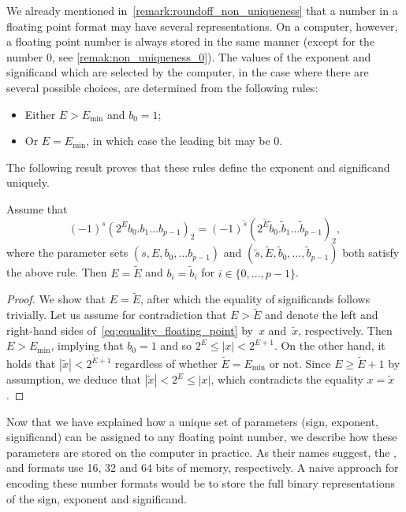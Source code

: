 We already mentioned  in~\cref{remark:roundoff_non_uniqueness} that
a number in a floating point format may have several representations.
On a computer, however, a floating point number is always stored in the same manner
(except for the number 0, see \cref{remak:non_uniqueness_0}).
The values of the exponent and significand which are selected by the computer,
in the case where there are several possible choices,
are determined from the following rules:
\begin{itemize}
    \item Either $E > E_{\min}$ and $b_0 = 1$;
    \item Or $E = E_{\min}$, in which case the leading bit may be 0.
\end{itemize}
The following result proves that these rules define the exponent and significand uniquely.
\begin{proposition}
    \label{prop:uniqueness_standard_representation}
    Assume that
    \begin{equation}
        \label{eq:equality_floating_point}
        (-1)^s (2^{E} b_0.b_1\dots b_{p-1})_2 = (-1)^{\widetilde s} (2^{\widetilde E} \widetilde b_0. \widetilde b_1\dots \widetilde b_{p-1})_2,
    \end{equation}
    where the parameter sets $(s, E, b_0, \dots b_{p-1})$ and $(\widetilde s, \widetilde E, \widetilde b_0, \dots, \widetilde b_{p-1})$ both satisfy the above rule.
    Then $E = \widetilde E$ and $b_i = \widetilde b_i$ for $i \in \{0, \dots, p-1\}$.
\end{proposition}
\begin{proof}
    We show that $E = \widetilde E$,
    after which the equality of significands follows trivially.
    Let us assume for contradiction that $E > \widetilde E$
    and denote the left and right-hand sides of~\eqref{eq:equality_floating_point} by~$x$ and~$\widetilde x$, respectively.
    Then~$E > E_{\min}$, implying that $b_0 = 1$ and so $2^{E} \leq |x| < 2^{E+1}$.
    On the other hand, it holds that $|\widetilde x| < 2^{\widetilde E+1}$ regardless of whether $\widetilde E = E_{\min}$ or not.
    Since $E \geq \widetilde E + 1$ by assumption,
    we deduce that $|\widetilde x| < 2^E \leq |x|$,
    which contradicts the equality $x = \widetilde x$.
\end{proof}

Now that we have explained how
a unique set of parameters (sign, exponent, significand) can be assigned to any floating point number,
we describe how these parameters are stored on the computer in practice.
As their names suggest, the ,  and  formats use 16, 32 and 64 bits of memory, respectively.
A naive approach for encoding these number formats would be to store the full binary representations of the sign, exponent and significand.

